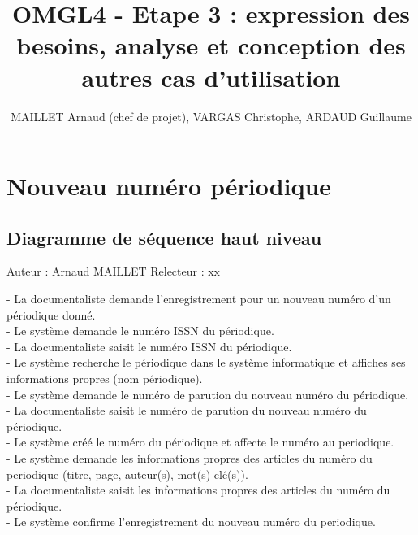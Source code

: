 \documentclass[a4paper,10pt]{report}
\title{OMGL4 - Etape 3 : expression des besoins, analyse et conception des autres cas d'utilisation}
\author{MAILLET Arnaud (chef de projet), VARGAS Christophe, ARDAUD Guillaume}
\begin{document}
\maketitle
\newpage
\null
\newpage
\tableofcontents
\newpage
\null
\newpage

\centering

\chapter*{Nouveau numéro périodique}
\section*{Diagramme de séquence haut niveau}

Auteur : Arnaud MAILLET
Relecteur : xx

\bigskip

\begin{flushleft}
- La documentaliste demande l'enregistrement pour un nouveau numéro d'un périodique donné.\\
- Le système demande le numéro ISSN du périodique.\\
- La documentaliste saisit le numéro ISSN du périodique.\\
- Le système recherche le périodique dans le système informatique et affiches ses informations propres (nom périodique).\\
- Le système demande le numéro de parution du nouveau numéro du périodique.\\
- La documentaliste saisit le numéro de parution du nouveau numéro du périodique.\\
- Le système créé le numéro du périodique et affecte le numéro au periodique.\\
- Le système demande les informations propres des articles du numéro du periodique (titre, page, auteur(s), mot(s) clé(s)).\\
- La documentaliste saisit les informations propres des articles du numéro du périodique.\\
- Le système confirme l'enregistrement du nouveau numéro du periodique.\\
\end{flushleft}

\bigskip
\end{document}
